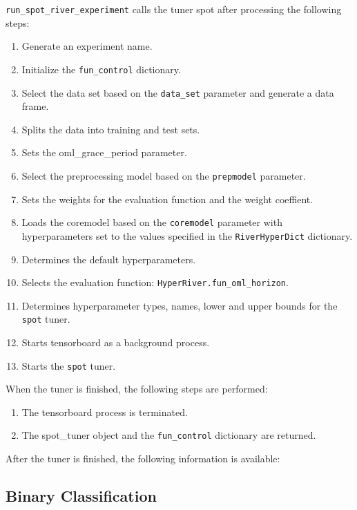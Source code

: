 \documentclass[
  letterpaper,
  DIV=11,
  numbers=noendperiod]{scrreprt}
\providecommand{\tightlist}{%
  \setlength{\itemsep}{0pt}\setlength{\parskip}{0pt}}\usepackage{longtable,booktabs,array}
\begin{document}
\texttt{run\_spot\_river\_experiment} calls the tuner spot after
processing the following steps:

\begin{enumerate}
\def\labelenumi{\arabic{enumi}.}
\tightlist
\item
  Generate an experiment name.
\item
  Initialize the \texttt{fun\_control} dictionary.
\item
  Select the data set based on the \texttt{data\_set} parameter and
  generate a data frame.
\item
  Splits the data into training and test sets.
\item
  Sets the oml\_grace\_period parameter.
\item
  Select the preprocessing model based on the \texttt{prepmodel}
  parameter.
\item
  Sets the weights for the evaluation function and the weight coeffient.
\item
  Loads the coremodel based on the \texttt{coremodel} parameter with
  hyperparameters set to the values specified in the
  \texttt{RiverHyperDict} dictionary.
\item
  Determines the default hyperparameters.
\item
  Selects the evaluation function:
  \texttt{HyperRiver.fun\_oml\_horizon}.
\item
  Determines hyperparameter types, names, lower and upper bounds for the
  \texttt{spot} tuner.
\item
  Starts tensorboard as a background process.
\item
  Starts the \texttt{spot} tuner.
\end{enumerate}

When the tuner is finished, the following steps are performed:

\begin{enumerate}
\def\labelenumi{\arabic{enumi}.}
\tightlist
\item
  The tensorboard process is terminated.
\item
  The spot\_tuner object and the \texttt{fun\_control} dictionary are
  returned.
\end{enumerate}

After the tuner is finished, the following information is available:

\hypertarget{binary-classification}{%
\subsection{Binary Classification}\label{binary-classification}}
\end{document}
